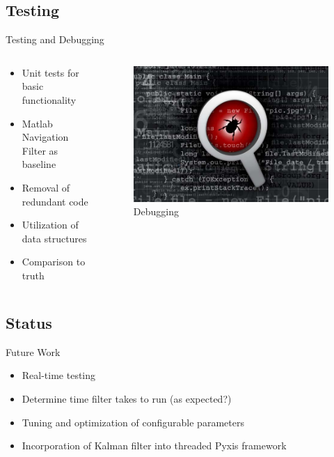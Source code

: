 \documentclass[10pt,aspectratio=169]{beamer}
\begin{document}
\subsection{Testing}
    \begin{frame}{Testing and Debugging}
        \begin{columns}
            \begin{column}{0.6\textwidth}
        \begin{itemize}
            \item Unit tests for basic functionality
            \item Matlab Navigation Filter as baseline
            \item Removal of redundant code
            \item Utilization of data structures
            \item Comparison to truth
        \end{itemize}
            \end{column}
            \begin{column}{0.4\textwidth}
                \begin{figure}
            \centering
                    \includegraphics[width=1\textwidth]{bug}
            \caption{Debugging\cite{bug:2013}}
                \end{figure}
            \end{column}
        \end{columns}
    \end{frame}

\subsection{Status}
    \begin{frame}{Future Work}
        \begin{itemize}
            \item Real-time testing
            \item Determine time filter takes to run (as expected?)
            \item Tuning and optimization of configurable parameters
            \item Incorporation of Kalman filter into threaded Pyxis framework
        \end{itemize}
    \end{frame}
\end{document}
